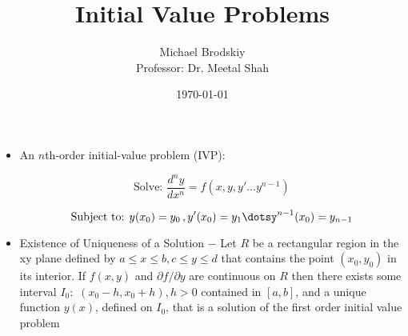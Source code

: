 \documentclass[12pt]{article}
\title{Initial Value Problems}
\date{\today}
\author{Michael Brodskiy\\ \small Professor: Dr. Meetal Shah}
\begin{document}
\maketitle

\begin{itemize}

  \item An $n$th-order initial-value problem (IVP):

    $$\text{Solve: }\frac{d^ny}{dx^n}=f(x,y,y'\dots y^{n-1})$$

    $$\text{Subject to: }y(x_0)=y_0\,,y'(x_0)=y_1\dotsy^{n-1}(x_0)=y_{n-1}$$

  \item   Existence of Uniqueness of a Solution $-$ Let $R$ be a rectangular region in the xy plane defined by $a\leq x\leq b,c\leq y\leq d$ that contains the point $(x_0,y_0)$ in its interior. If $f(x,y)$ and $\partial f / \partial y$ are continuous on $R$ then there exists some interval $I_0:\,\,(x_0-h,x_0+h), h>0$ contained in $[a,b]$, and a unique function $y(x)$, defined on $I_0$, that is a solution of the first order initial value problem 

\end{itemize}
\end{document}
